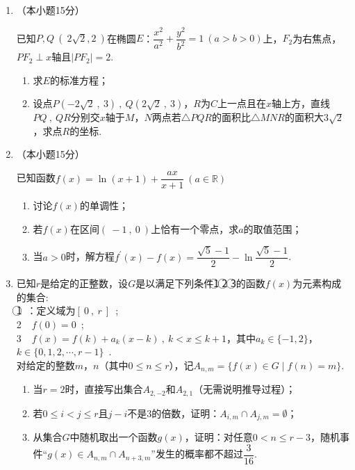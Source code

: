 \documentclass[11pt,a4paper]{ctexart}
\begin{document}
\begin{enumerate}[start=16]
    \item （本小题15分）
    
    已知$P,Q\ (\ 2 \sqrt{2},2\ )$在椭圆$E$：$\dfrac{x^2}{a^2}+\dfrac{y^2}{b^2}=1\ (a>b>0)$上，$F_2$为右焦点，$PF_2 \perp x$轴且$\mid PF_2 \mid =2 $.
    \begin{enumerate}[label=(\Roman*)]
        \item 求$E$的标准方程；
        \item 设点$P(-2\sqrt{2}\ ,\ 3)\ ,\ Q(2\sqrt{2}\ ,\ 3)$，$R$为$C$上一点且在$x$轴上方，直线$PQ\ ,\ QR$分别交$x$轴于$M$，$N$两点若$\triangle PQR$的面积比$\triangle MNR$的面积大$3\sqrt{2}$，求点$R$的坐标.
    \end{enumerate}
    
    \newpage
    \item （本小题15分）

    已知函数$f(x)=\ln (x+1)+\dfrac{ax}{x+1}\ (a \in \mathbb{R}) $
    \begin{enumerate}[label=(\Roman*)]
        \item 讨论$f(x)$的单调性；
        \item 若$f(x)$在区间$(\ -1\ ,\  0\ )$上恰有一个零点，求$a$的取值范围；
        \item 当$a>0$时，解方程$f^{'}(x)-f(x)=\dfrac{\sqrt{5}-1}{2}-\ln \dfrac{\sqrt{5}-1}{2}$.
    \end{enumerate}

    \vspace*{\fill}
    \item 已知$r$是给定的正整数，设$G$是以满足下列条件\textcircled{1} \textcircled{2} \textcircled{3}的函数$f(x)$为元素构成的集合:\\
    \textcircled{1}\ ：定义域为$[\ 0\ ,\ r\ ]$\ ;\\
    \textcircled{2}\ ：$f(0)=0$\ ;\\
    \textcircled{3}\ ：$f(x)=f(k)+a_k(x-k)\ ,\ k<x \le k+1$，其中$a_k \in \{-1,2\}$，$k \in\{0,1,2,\cdots,r-1\}$\ .\\
    对给定的整数$m$，$n$（其中$0 \le n \le r$），记$A_{n,m}=\{f(x)\in G\mid f(n)=m\}$.
    \begin{enumerate}[label=(\Roman*)]
        \item 当$r=2$时，直接写出集合$A_{2,-2}$和$A_{2,1}$（无需说明推导过程）；
        \item 若$0 \le i<j \le r$且$j-i$不是$3$的倍数，证明：$A_{i,m} \cap A_{j,m}= \emptyset$；
        \item 从集合$G$中随机取出一个函数$g(x)$，证明：对任意$0 <n \le r-3$，随机事件“$g(x) \in A_{n,m} \cap A_{n+3,m}$”发生的概率都不超过$\dfrac{3}{16}$.
    \end{enumerate}
    \vspace*{\fill}
    
\end{enumerate}
\end{document}

